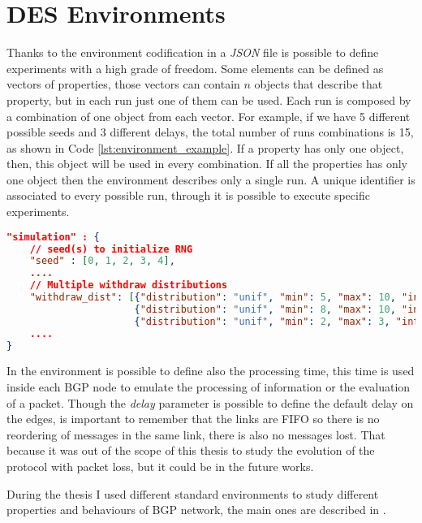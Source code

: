 \section{DES Environments}
\label{sec:des_environment}

Thanks to the environment codification in a \textit{JSON} file is possible to
define experiments with a high grade of freedom.
Some elements can be defined as vectors of properties, those vectors can
contain $n$ objects that describe that property, but in each run just one
of them can be used.
Each run is composed by a combination of one object from each vector.
For example, if we have \num{5} different
possible seeds and \num{3} different delays, the total number of runs combinations
is \num{15}, as shown in Code \ref{lst:environment_example}.
If a property has only one object, then, this object will be used in every
combination.
If all the properties has only one object then the environment describes only
a single run.
A unique identifier is associated to every possible run, through it is possible
to execute specific experiments.

\begin{lstlisting}[language=json, caption=Environment example, label=lst:environment_example]
"simulation" : {
    // seed(s) to initialize RNG
    "seed" : [0, 1, 2, 3, 4],
    ....
    // Multiple withdraw distributions
    "withdraw_dist": [{"distribution": "unif", "min": 5, "max": 10, "int": 0.1},
                      {"distribution": "unif", "min": 8, "max": 10, "int": 0.1},
                      {"distribution": "unif", "min": 2, "max": 3, "int": 0.1}],
    ....
}
\end{lstlisting}

In the environment is possible to define also the processing time, this time is used
inside each \ac{BGP} node to emulate the processing of information or the evaluation
of a packet.
Though the \textit{delay} parameter is possible to define the default delay on the edges,
is important to remember that the links are FIFO so there is no reordering
of messages in the same link, there is also no messages lost.
That because it was out of the scope of this thesis to study the evolution
of the protocol with packet loss, but it could be in the future works.

During the thesis I used different standard environments to study different
properties and behaviours of \ac{BGP} network, the main ones are described in
.

